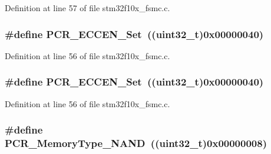 Definition at line 57 of file stm32f10x\+\_\+fsmc.\+c.

\subsubsection[{\texorpdfstring{P\+C\+R\+\_\+\+E\+C\+C\+E\+N\+\_\+\+Set}{PCR_ECCEN_Set}}]{\setlength{\rightskip}{0pt plus 5cm}\#define P\+C\+R\+\_\+\+E\+C\+C\+E\+N\+\_\+\+Set~(({\bf uint32\+\_\+t})0x00000040)}\hypertarget{group___f_s_m_c___private___defines_ga8a0d7950936e3869b449d421e03a19ac}{}\label{group___f_s_m_c___private___defines_ga8a0d7950936e3869b449d421e03a19ac}


Definition at line 56 of file stm32f10x\+\_\+fsmc.\+c.

\subsubsection[{\texorpdfstring{P\+C\+R\+\_\+\+E\+C\+C\+E\+N\+\_\+\+Set}{PCR_ECCEN_Set}}]{\setlength{\rightskip}{0pt plus 5cm}\#define P\+C\+R\+\_\+\+E\+C\+C\+E\+N\+\_\+\+Set~(({\bf uint32\+\_\+t})0x00000040)}\hypertarget{group___f_s_m_c___private___defines_ga8a0d7950936e3869b449d421e03a19ac}{}\label{group___f_s_m_c___private___defines_ga8a0d7950936e3869b449d421e03a19ac}


Definition at line 56 of file stm32f10x\+\_\+fsmc.\+c.

\subsubsection[{\texorpdfstring{P\+C\+R\+\_\+\+Memory\+Type\+\_\+\+N\+A\+ND}{PCR_MemoryType_NAND}}]{\setlength{\rightskip}{0pt plus 5cm}\#define P\+C\+R\+\_\+\+Memory\+Type\+\_\+\+N\+A\+ND~(({\bf uint32\+\_\+t})0x00000008)}\hypertarget{group___f_s_m_c___private___defines_gaf3992efb285ab994c41463af5107c501}{}\label{group___f_s_m_c___private___defines_gaf3992efb285ab994c41463af5107c501}


